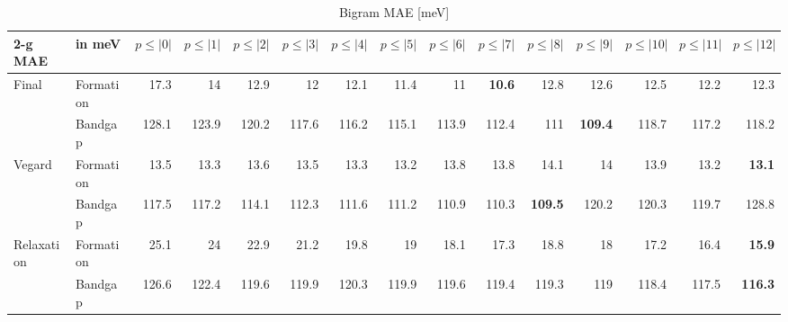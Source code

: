 \documentclass[11pt,oneside,czech,american]{book} %
\theoremstyle{definition} %
\theoremstyle{definition}
\begin{document}
\begin{table}[H]
	\scriptsize
	\centering
\begin{tabular}{llrrrrrrrrrrrrr}
	\hline
	2-g MAE    & in meV   &   $p{\leq}|0|$ &   $p{\leq}|1|$ &   $p{\leq}|2|$ &   $p{\leq}|3|$ &   $p{\leq}|4|$ &   $p{\leq}|5|$ &   $p{\leq}|6|$ &   $p{\leq}|7|$ &   $p{\leq}|8|$ &   $p{\leq}|9|$ &   $p{\leq}|10|$ &   $p{\leq}|11|$ &   $p{\leq}|12|$\\
	\hline
	\multirow{2}{*}{Final}      & Formation &       17.3 &       14   &       12.9 &       12   &       12.1 &       11.4 &       11   &       \textbf{10.6} &       12.8 &       12.6 &        12.5 &        12.2 &        12.3\\
	      & Bandgap   &      128.1 &      123.9 &      120.2 &      117.6 &      116.2 &      115.1 &      113.9 &      112.4 &      111   &      \textbf{109.4} &       118.7 &       117.2 &       118.2\\
	\multirow{2}{*}{Vegard}     & Formation &       13.5 &       13.3 &       13.6 &       13.5 &       13.3 &       13.2 &       13.8 &       13.8 &       14.1 &       14   &        13.9 &        13.2 &        \textbf{13.1}\\
	     & Bandgap   &      117.5 &      117.2 &      114.1 &      112.3 &      111.6 &      111.2 &      110.9 &      110.3 &      \textbf{109.5} &      120.2 &       120.3 &       119.7 &       128.8\\
	\multirow{2}{*}{Relaxation} & Formation &       25.1 &       24   &       22.9 &       21.2 &       19.8 &       19   &       18.1 &       17.3 &       18.8 &       18   &        17.2 &        16.4 &        \textbf{15.9}\\
	 & Bandgap   &      126.6 &      122.4 &      119.6 &      119.9 &      120.3 &      119.9 &      119.6 &      119.4 &      119.3 &      119   &       118.4 &       117.5 &       \textbf{116.3}\\
	\hline
\end{tabular}
	\caption{Bigram MAE [meV]}
	\label{2-g MAE}
\end{table}
\end{document}
